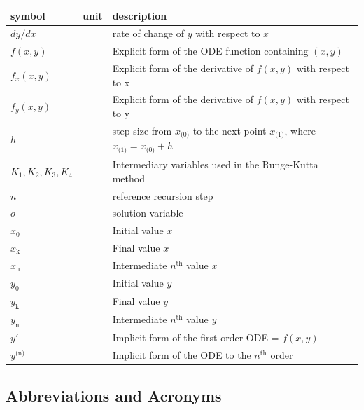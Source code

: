 \documentclass[12pt]{article}
\begin{document}
\renewcommand{\arraystretch}{1.2}
\noindent \begin{longtable*}{l l p{12cm}} \toprule
\textbf{symbol} & \textbf{unit} & \textbf{description}\\
\midrule
$dy/dx$ & \text {-} & rate of change of $y$ with respect to $x$\\
$f(x, y)$ & \text{-} & Explicit form of the ODE function containing $(x,y)$\\
$f_{x}(x, y)$ & \text{-} & Explicit form of the derivative of $f(x, y)$ with respect to x\\
$f_{y}(x, y)$ & \text{-} & Explicit form of the derivative of $f(x, y)$ with respect to y\\
$h$ & \text{-} & step-size from $x_\text{(0)}$ to the next point $x_\text{(1)}$, where $x_\text{(1)} = x_\text{(0)} + h$\\
$K_1, K_2, K_3, K_4$ & \text{-} & Intermediary variables used in the Runge-Kutta method\\
$n$ & \text{-} & reference recursion step\\
$o$ & \text{-} & solution variable\\
$x_\text{0}$ & \text{-} & Initial value $x$\\
$x_\text{k}$ & \text{-} & Final value $x$\\
$x_\text{n}$ & \text{-} & Intermediate $n^\text{th}$ value $x$\\
$y_\text{0}$ & \text{-} & Initial value $y$\\ 
$y_\text{k}$ & \text{-} & Final value $y$\\
$y_\text{n}$ & \text{-} & Intermediate $n^\text{th}$ value $y$\\ 
$y'$ & \text{-} & Implicit form of the first order ODE = $f(x, y)$\\
$y^\text{(n)}$ & \text{-} & Implicit form of the ODE to the $n^\text{th}$ order\\
\bottomrule
\end{longtable*}

\subsection{Abbreviations and Acronyms}
\end{document}
